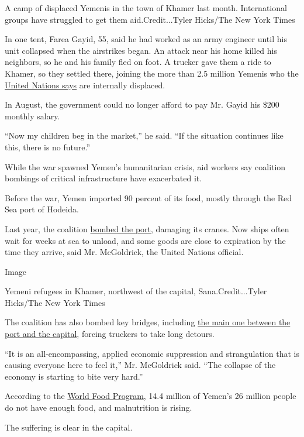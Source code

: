 A camp of displaced Yemenis in the town of Khamer last month.
International groups have struggled to get them aid.Credit...Tyler
Hicks/The New York Times

In one tent, Farea Gayid, 55, said he had worked as an army engineer
until his unit collapsed when the airstrikes began. An attack near his
home killed his neighbors, so he and his family fled on foot. A trucker
gave them a ride to Khamer, so they settled there, joining the more than
2.5 million Yemenis who the
\href{http://reporting.unhcr.org/node/2647\#_ga=1.211671634.657052128.1471022517}{United
Nations says} are internally displaced.

In August, the government could no longer afford to pay Mr. Gayid his
\$200 monthly salary.

``Now my children beg in the market,'' he said. ``If the situation
continues like this, there is no future.''

While the war spawned Yemen's humanitarian crisis, aid workers say
coalition bombings of critical infrastructure have exacerbated it.

Before the war, Yemen imported 90 percent of its food, mostly through
the Red Sea port of Hodeida.

Last year, the coalition
\href{http://www.reuters.com/article/us-yemen-security-idUSKCN0QN0HX20150819}{bombed
the port}, damaging its cranes. Now ships often wait for weeks at sea to
unload, and some goods are close to expiration by the time they arrive,
said Mr. McGoldrick, the United Nations official.

Image

Yemeni refugees in Khamer, northwest of the capital, Sana.Credit...Tyler
Hicks/The New York Times

The coalition has also bombed key bridges, including
\href{https://twitter.com/AmbassadorPower/status/765682969520418817}{the
main one between the port and the capital}, forcing truckers to take
long detours.

``It is an all-encompassing, applied economic suppression and
strangulation that is causing everyone here to feel it,'' Mr. McGoldrick
said. ``The collapse of the economy is starting to bite very hard.''

According to the \href{https://www.wfp.org/countries/yemen}{World Food
Program}, 14.4 million of Yemen's 26 million people do not have enough
food, and malnutrition is rising.

The suffering is clear in the capital.

